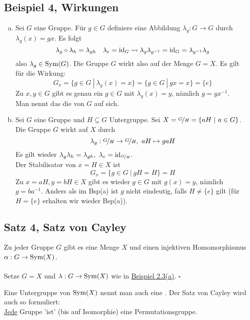 \subsection{Beispiel 4, Wirkungen}
\label{sub:bsp_wirkungen}
\begin{enumerate}[(a)]
	\item Sei $G$ eine Gruppe. 
	Für $g\in G$ definiere eine Abbildung $\lambda_g:G\to G$ durch $\lambda_g(x)=gx$. 
	Es folgt
	\[
	\lambda_g\circ\lambda_h=\lambda_{gh} \quad \lambda_e=\operatorname{id}_G \rightsquigarrow \lambda_g\lambda_{g^{-1}}=\operatorname{id}_G=\lambda_{g^{-1}}\lambda_g 
	\]
	also $\lambda_g\in \operatorname{Sym}(G)$. 
	Die Gruppe $G$ wirkt also auf der Menge $G=X$. 
	Es gilt für die Wirkung:
	\[
	G_x=\{g\in G~|~\lambda_g(x)=x \}=\{g\in G~|~gx=x \}=\{e\} 
	\]
	Zu $x,y\in G$ gibt es genau ein $g\in G$ mit $\lambda_g(x)=y$, nämlich $g=yx^{-1}$.\\
	Man nennt das die  von $G$ auf sich.
	\item Sei $G$ eine Gruppe und $H\subseteq G$ Untergruppe. 
	Sei $X=\nicefrac{G}{H}=\{aH~|~a\in G \}$. 
	Die Gruppe $G$ wirkt auf $X$ durch 
	\[
	\lambda_g:\nicefrac{G}{H}\to \nicefrac{G}{H},~aH\mapsto gaH 
	\]
	Es gilt wieder $\lambda_g\lambda_h=\lambda_{gh},~\lambda_e=\operatorname{id}_{\nicefrac{G}{H}}$.\\
	Der Stabilisator von $x=H\in X$ ist 
	\[
	G_x=\{g\in G~|~gH=H \}=H 
	\]
	Zu $x=aH,y=bH\in X$ gibt es wieder $g\in G$ mit $g(x)=y$, nämlich $g=ba^{-1}$. 
	Anders als im Bsp(a) ist $g$ nicht eindeutig, falls $H\not= \{e\}$ gilt (für $H=\{e\}$ erhalten wir wieder Bsp(a)). 
\end{enumerate}

\subsection{Satz 4, Satz von Cayley}
\label{sub:satz_von_cayley}
Zu jeder Gruppe $G$ gibt es eine Menge $X$ und einen injektiven Homomorphismus $\alpha:G\to \operatorname{Sym}(X)$.\\

\\
Setze $G=X$ und $\lambda:G\to \operatorname{Sym}(X)$ wie in \hyperref[sub:bsp_wirkungen]{Beispiel 2.3(a)}.
\hfill $\square$

Eine Untergruppe von $\operatorname{Sym}(X)$ nennt man auch eine . 
Der Satz von Cayley wird auch so formuliert:\\
\uline{Jede} Gruppe 'ist' (bis auf Isomorphie) eine Permutationsgruppe.

